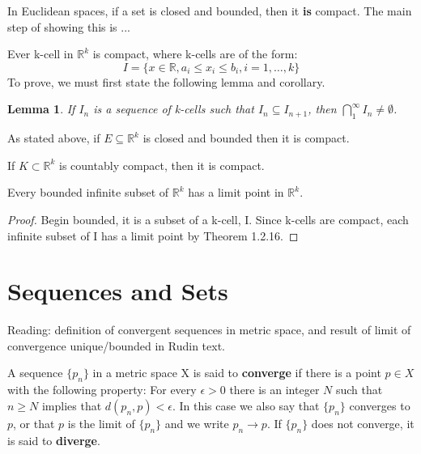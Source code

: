 \documentclass[11pt,fleqn]{book} %
\begin{document}
In Euclidean spaces, if a set is closed and bounded, then it \textbf{is} compact. The main step of showing this is ...

\begin{theorem}
 	Ever k-cell in $\mathbb{R}^k$ is compact, where k-cells are of the form:
 	$$I = \{x \in \mathbb{R}, a_i \le x_i \le b_i, i=1,\dots,k \} $$
 	To prove, we must first state the following lemma and corollary. 
 \end{theorem} 

\newtheorem{lemma}{Lemma}

 \begin{lemma}
 	If $I_n$ is a sequence of k-cells such that $I_n \subseteq I_{n+1}$, then $\bigcap\limits_1^\infty I_n \neq \emptyset$.
 \end{lemma}

 \begin{corollary}
 	As stated above, if $E \subseteq \mathbb{R}^k$ is closed and bounded then it is compact. 
 \end{corollary}

\begin{theorem}
	If $K \subset \mathbb{R}^k$ is countably compact, then it is compact.
\end{theorem}

\begin{theorem}
	Every bounded infinite subset of $\mathbb{R}^k$ has a limit point in $\mathbb{R}^k$.
\end{theorem}

\begin{proof}
	Begin bounded, it is a subset of a k-cell, I. Since k-cells are compact, each infinite subset of I has a limit point by Theorem 1.2.16. 
\end{proof}

\section{Sequences and Sets}

\begin{remark}
	Reading: definition of convergent sequences in metric space, and result of limit of convergence unique/bounded in Rudin text.
\end{remark}

\begin{definition}[Converge]
A sequence $\{p_n\}$ in a metric space X is said to \textbf{converge} if there is a point $p \in X$ with the following property: For every $\epsilon > 0$ there is an integer $N$ such that $n\ge N$ implies that $d(p_n, p) < \epsilon$. 
In this case we also say that $\{p_n\}$ converges to $p$, or that $p$ is the limit of $\{p_n\}$ and we write $p_n \rightarrow p$. If $\{p_n\}$ does not converge, it is said to \textbf{diverge}.
\end{definition}
\end{document}
